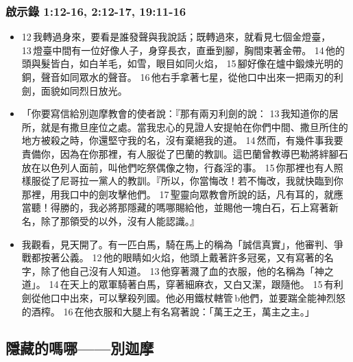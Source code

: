 \subsubsection{啟示錄 1:12-16, 2:12-17, 19:11-16}
\begin{itemize} 
\itemsep-.25em
\item 12 我轉過身來，要看是誰發聲與我說話；既轉過來，就看見七個金燈臺， 13 燈臺中間有一位好像人子，身穿長衣，直垂到腳，胸間束著金帶。 14 他的頭與髮皆白，如白羊毛，如雪，眼目如同火焰， 15 腳好像在爐中鍛煉光明的銅，聲音如同眾水的聲音。 16 他右手拿著七星，從他口中出來一把兩刃的利劍，面貌如同烈日放光。
\item 「你要寫信給別迦摩教會的使者說：『那有兩刃利劍的說： 13 我知道你的居所，就是有撒旦座位之處。當我忠心的見證人安提帕在你們中間、撒旦所住的地方被殺之時，你還堅守我的名，沒有棄絕我的道。 14 然而，有幾件事我要責備你，因為在你那裡，有人服從了巴蘭的教訓。這巴蘭曾教導巴勒將絆腳石放在以色列人面前，叫他們吃祭偶像之物，行姦淫的事。 15 你那裡也有人照樣服從了尼哥拉一黨人的教訓。『所以，你當悔改！若不悔改，我就快臨到你那裡，用我口中的劍攻擊他們。 17 聖靈向眾教會所說的話，凡有耳的，就應當聽！得勝的，我必將那隱藏的嗎哪賜給他，並賜他一塊白石，石上寫著新名，除了那領受的以外，沒有人能認識。』
\item 我觀看，見天開了。有一匹白馬，騎在馬上的稱為「誠信真實」，他審判、爭戰都按著公義。 12 他的眼睛如火焰，他頭上戴著許多冠冕，又有寫著的名字，除了他自己沒有人知道。 13 他穿著濺了血的衣服，他的名稱為「神之道」。 14 在天上的眾軍騎著白馬，穿著細麻衣，又白又潔，跟隨他。 15 有利劍從他口中出來，可以擊殺列國。他必用鐵杖轄管 b他們，並要踹全能神烈怒的酒榨。 16 在他衣服和大腿上有名寫著說：「萬王之王，萬主之主。」
\end{itemize} 



\subsection{隱藏的嗎哪——別迦摩}

